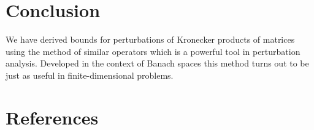 \documentclass[a4paper]{jpconf}
\begin{document}
\section*{Conclusion}
We have derived bounds
    for perturbations of Kronecker products
    of matrices
    using the method of similar operators
    which is a powerful tool in perturbation analysis.
Developed in the context of Banach spaces
    this method turns out to be just as useful
    in finite-dimensional problems.
\section*{References}

{}
\end{document}
